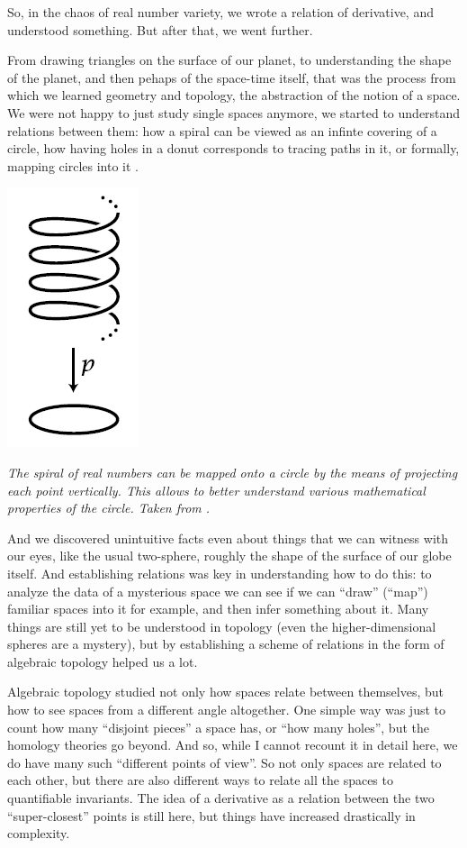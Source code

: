 \documentclass{article}
\begin{document}
So, in the chaos of real number variety, we wrote a relation of derivative, and understood something. But after that, we went further.

From drawing triangles on the surface of our planet, to understanding the shape of the planet, and then pehaps of the space-time itself, that was the process from which we learned geometry and topology, the abstraction of the notion of a space. We were not happy to just study single spaces anymore, we started to understand relations between them: how a spiral can be viewed as an infinte covering of a circle, how having holes in a donut corresponds to tracing paths in it, or formally, mapping circles into it \cite{HATCHER}.

\begin{center}
\includegraphics[scale=0.7]{UniversalCoveringOfCircle}

\textit{The spiral of real numbers can be mapped onto a circle by the means of projecting each point vertically. This allows to better understand various mathematical properties of the circle. Taken from \cite{NLABCIRC}.}
\end{center}


 And we discovered unintuitive facts even about things that we can witness with our eyes, like the usual two-sphere, roughly the shape of the surface of our globe itself. And establishing relations was key in understanding how to do this: to analyze the data of a mysterious space we can see if we can “draw” (“map”) familiar spaces into it for example, and then infer something about it. Many things are still yet to be understood in topology (even the higher-dimensional spheres are a mystery), but by establishing a scheme of relations in the form of algebraic topology \cite{HATCHER, MAY} helped us a lot.

Algebraic topology studied not only how spaces relate between themselves, but how to see spaces from a different angle altogether. One simple way was just to count how many “disjoint pieces” a space has, or “how many holes”, but the homology theories go beyond. And so, while I cannot recount it in detail here, we do have many such “different points of view”. So not only spaces are related to each other, but there are also different ways to relate all the spaces to quantifiable invariants. The idea of a derivative as a relation between the two “super-closest” points is still here, but things have increased drastically in complexity.
\end{document}
